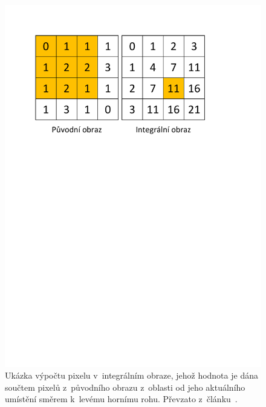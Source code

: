 \begin{figure}[hbt]
	\centering
	\setlength{\fboxsep}{0pt}
	\includegraphics[width=1.0\textwidth]{obrazky-figures/IntegralImageCreation.pdf}
	\caption{Ukázka výpočtu pixelu v~integrálním obraze, jehož hodnota je dána součtem pixelů z~původního obrazu z~oblasti od jeho aktuálního umístění směrem k~levému hornímu rohu. Převzato z~článku~\cite{website:FaceDetectionViolaJones}.}
	\label{img:IntegralImageCreation}
\endminipage\hfill
{}
	\centering
	\setlength{\fboxsep}{0pt}

\end{figure}
